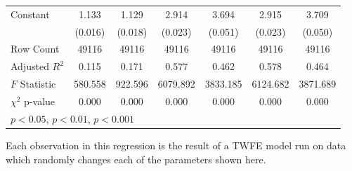 \documentclass[12pt]{article}
\begin{document}
\begin{landscape}
\begin{table}[htbp]
{\begin{tabular}{l*{6}{c}}
Constant            &       1.133\sym{***}&       1.129\sym{***}&       2.914\sym{***}&       3.694\sym{***}&       2.915\sym{***}&       3.709\sym{***}\\
                    &     (0.016)         &     (0.018)         &     (0.023)         &     (0.051)         &     (0.023)         &     (0.050)         \\
\hline
Row Count           &   49116         &   49116         &   49116         &   49116         &   49116         &   49116         \\
Adjusted $R^2$  &       0.115         &       0.171         &       0.577         &       0.462         &       0.578         &       0.464         \\
$F$ Statistic         &     580.558         &     922.596         &    6079.892         &    3833.185         &    6124.682         &    3871.689         \\
$\chi^2$ p-value &       0.000         &       0.000         &       0.000         &       0.000         &       0.000         &       0.000         \\
\hline\hline
\multicolumn{7}{l}{\footnotesize \sym{*} \(p<0.05\), \sym{**} \(p<0.01\), \sym{***} \(p<0.001\)}\\
\end{tabular}
}
\footnotesize  
\vspace{5mm}
    \footnotesize \begin{singlespace*}
        Each observation in this regression is the result of a TWFE model run on data which randomly changes each of the parameters shown here.
    \end{singlespace*}
\end{table}
\end{landscape}
\end{document}
